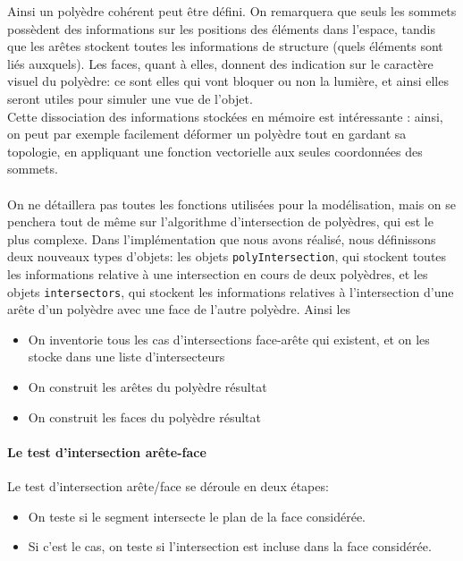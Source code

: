 \documentclass[a4paper]{article}
\begin{document}
      Ainsi un polyèdre cohérent peut être défini. On remarquera que seuls les sommets possèdent des informations sur les positions des éléments dans l'espace, tandis que les arêtes stockent toutes les informations de structure (quels éléments sont liés auxquels). Les faces, quant à elles, donnent des indication sur le caractère visuel du polyèdre: ce sont elles qui vont bloquer ou non la lumière, et ainsi elles seront utiles pour simuler une vue de l'objet.\\
      Cette dissociation des informations stockées en mémoire est intéressante : ainsi, on peut par exemple facilement déformer un polyèdre tout en gardant sa topologie, en appliquant une fonction vectorielle aux seules coordonnées des sommets.\\
      \\
      On ne détaillera pas toutes les fonctions utilisées pour la modélisation, mais on se penchera tout de même sur l'algorithme d'intersection de polyèdres, qui est le plus complexe. Dans l'implémentation que nous avons réalisé, nous définissons deux nouveaux types d'objets: les objets \texttt{polyIntersection}, qui stockent toutes les informations relative à une intersection en cours de deux polyèdres, et les objets \texttt{intersectors}, qui stockent les informations relatives à l'intersection d'une arête d'un polyèdre avec une face de l'autre polyèdre. Ainsi les

      \begin{itemize}
        \item On inventorie tous les cas d'intersections face-arête qui existent, et on les stocke dans une liste d'intersecteurs
        \item On construit les arêtes du polyèdre résultat
        \item On construit les faces du polyèdre résultat
      \end{itemize}

      \paragraph{Le test d'intersection arête-face}
        
        Le test d'intersection arête/face se déroule en deux étapes:
        \begin{itemize}
          \item On teste si le segment intersecte le plan de la face considérée.
          \item Si c'est le cas, on teste si l'intersection est incluse dans la face considérée. 
        \end{itemize}
         
\end{document}

